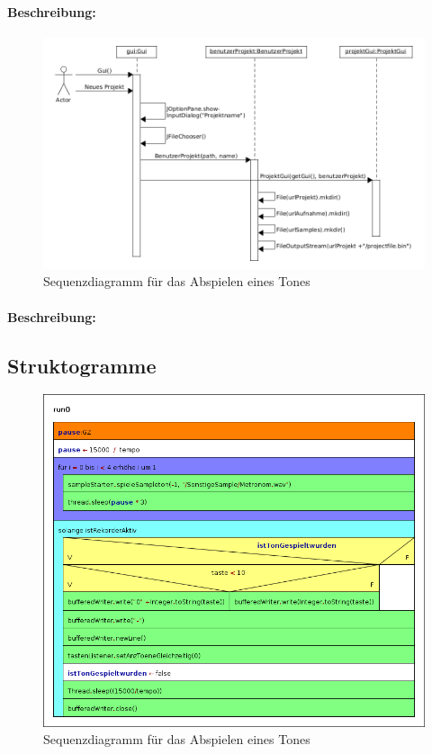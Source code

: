 \paragraph{Beschreibung:} 


\newpage

\begin{figure}[h]
 \centering
 \includegraphics[width=1\textwidth]{./Bilder/Neues_Projekt.png}
 \caption{Sequenzdiagramm für das Abspielen eines Tones}
\end{figure}

\paragraph{Beschreibung:} 


\newpage

\subsection{Struktogramme}


\begin{figure}[h]
 \centering
 \includegraphics[width=1\textwidth]{./Bilder/Ton_Aufnehmen.png}
 \caption{Sequenzdiagramm für das Abspielen eines Tones}
\end{figure}

